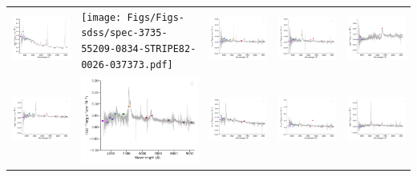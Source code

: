\begin{center}
\begin{longtable}{l l l l l }
    \includegraphics[width=0.19\linewidth, clip]{Figs/Figs-sdss/spec-3609-55201-0610-STRIPE82-0044-021486.pdf} & \texttt{[image: Figs/Figs-sdss/spec-3735-55209-0834-STRIPE82-0026-037373.pdf]} & \includegraphics[width=0.19\linewidth, clip]{Figs/Figs-sdss/spec-3775-55207-0067-SPLUS-n03s19-045911.pdf} & \includegraphics[width=0.19\linewidth, clip]{Figs/Figs-sdss/spec-3776-55209-0054-SPLUS-n03s23-033092.pdf} & \includegraphics[width=0.19\linewidth, clip]{Figs/Figs-sdss/spec-3776-55209-0768-SPLUS-n02s22-016624.pdf} \\
    \includegraphics[width=0.19\linewidth, clip]{Figs/Figs-sdss/spec-3777-55210-0616-SPLUS-n02s25-003956.pdf} & \includegraphics[width=0.19\linewidth, clip]{Figs/Figs-sdss/spec-3845-55323-0406-SPLUS-n01s24-009687.pdf} & \includegraphics[width=0.19\linewidth, clip]{Figs/Figs-sdss/spec-3847-55588-0744-SPLUS-n02n27-026395.pdf} & \includegraphics[width=0.19\linewidth, clip]{Figs/Figs-sdss/spec-3847-55588-0794-SPLUS-n02n27-022071.pdf} & \includegraphics[width=0.19\linewidth, clip]{Figs/Figs-sdss/spec-4004-55321-0054-SPLUS-n02s37-051418.pdf} \\

\end{longtable}
\end{center}
